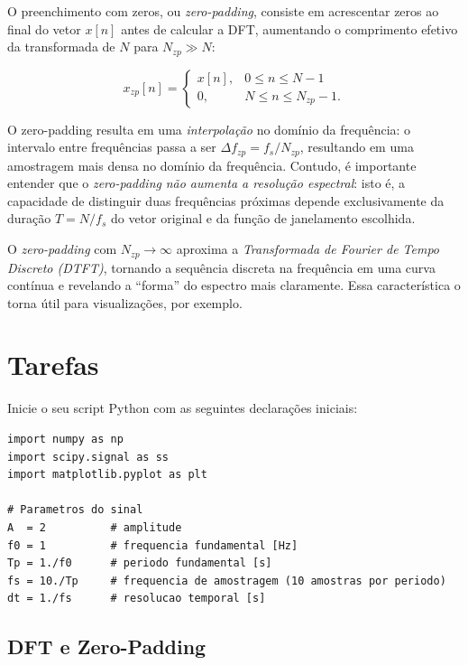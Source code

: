 \documentclass[a4paper,twoside,12pt]{article}
\begin{document}
	O preenchimento com zeros, ou \textit{zero-padding}, consiste em acrescentar zeros ao final do vetor $x[n]$ antes de calcular a DFT, aumentando o comprimento efetivo da transformada de $N$ para $N_{zp} \gg N$:
	
	\begin{equation}
		x_{zp}[n] = \begin{cases} x[n], & 0 \leq n \leq N-1 \\ 0, & N \leq n \leq N_{zp}-1. \end{cases}
	\end{equation}
	
	O zero-padding resulta em uma \emph{interpolação} no domínio da frequência: o intervalo entre frequências passa a ser $\Delta f_{zp} = f_s / N_{zp}$, resultando em uma amostragem mais densa no domínio da frequência. Contudo, é importante entender que o \textit{zero-padding} \emph{não aumenta a resolução espectral}: isto é, a capacidade de distinguir duas frequências próximas depende exclusivamente da duração $T = N / f_s$ do vetor original e da função de janelamento escolhida.
	
	O \textit{zero-padding} com $N_{zp} \to \infty$ aproxima a \emph{Transformada de Fourier de Tempo Discreto (DTFT)}, tornando a sequência discreta na frequência em uma curva contínua e revelando a ``forma'' do espectro mais claramente. Essa característica o torna útil para visualizações, por exemplo.
	

	\section{Tarefas}
	
	Inicie o seu script Python com as seguintes declarações iniciais:
	
	\begin{lstlisting}[frame=single, caption={Configurações iniciais comuns aos exercícios.}]
import numpy as np
import scipy.signal as ss
import matplotlib.pyplot as plt

# Parametros do sinal
A  = 2          # amplitude
f0 = 1          # frequencia fundamental [Hz]
Tp = 1./f0      # periodo fundamental [s]
fs = 10./Tp     # frequencia de amostragem (10 amostras por periodo)
dt = 1./fs      # resolucao temporal [s]
	\end{lstlisting}
	
	\subsection{DFT e Zero-Padding}
	
\end{document}
